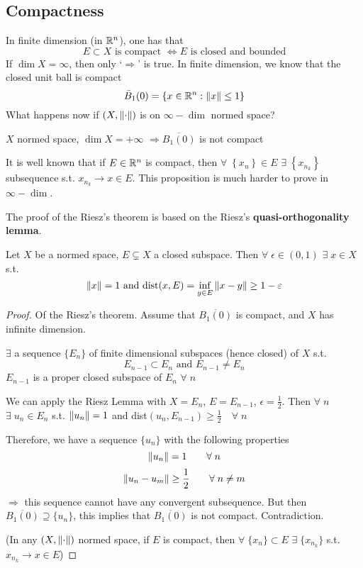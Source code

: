 \subsection*{Compactness}
In finite dimension (in \(\mathbb{R}^n\)), one has that
\[
    E \subset X \mbox{ is compact } \Leftrightarrow E \mbox{ is closed and bounded}
\]
If \(\dim X = \infty\), then only `\(\Rightarrow\)' is true. In finite dimension, we know that the closed unit ball is compact
\[
    \bar{B}_1(0) = \left\{ x \in \mathbb{R}^n : \norm{x} \leq 1\right\}
\]
What happens now if \((X, \norm{\cdot})\) is on \(\infty-\dim\) normed space?
\begin{theorem}
    \(X\) normed space, \(\dim X = +\infty\) \(\Rightarrow \overline{B_1(0)}\) is not compact
\end{theorem}
\begin{remark}
    It is well known that if \(E \in \mathbb{R}^n\) is compact, then \(\forall \; \left\{ x_n \right\} \in E \) \(\exists \; \left\{ x_{n_k} \right\}\) subsequence s.t. \(x_{n_k} \to x \in E\).  
    This proposition is much harder to prove in \(\infty-\dim\).
\end{remark}
The proof of the Riesz's theorem is based on the Riesz's \textbf{quasi-orthogonality lemma}.
\begin{lemma}
    Let \(X\) be a normed space, \(E \subsetneq X\) a closed subspace. 
    Then \(\forall \; \epsilon \in (0,1)\) \(\exists \; x \in X\) s.t.
    \[
        \norm{x}=1 \text{ and dist}(x, E) = \inf_{y \in E} \norm{x-y} \geq 1- \varepsilon
    \]
\end{lemma}
\begin{proof}
    Of the Riesz's theorem. Assume that \(\overline{B_1(0)}\) is compact, and \(X \) has infinite dimension. 

    \(\exists\) a sequence \(\{E_n\}\) of finite dimensional subspaces (hence closed) of \(X\) s.t. 
    \[
        E_{n-1} \subset E_n \text{ and } E_{n-1} \neq E_n
    \]
    \(E_{n-1}\) is a proper closed subspace of \(E_n\) \(\forall\; n\)

    We can apply the Riesz Lemma with \(X = E_n\), \(E=E_{n-1}\), \(\epsilon=\frac{1}{2}\). 
    Then \(\forall \; n\) \(\exists \; u_n \in E_n  \) s.t. \(\norm{u_n}=1\) and dist\((u_n, E_{n-1}) \geq \frac{1}{2} \quad \forall\; n\)
    
    Therefore, we have a sequence \(\{u_n\}\) with the following properties 
    \[
        \norm{u_n}=1 \qquad \forall\; n
    \]
    \[
        \norm{u_n-u_m} \geq \frac{1}{2} \qquad \forall\; n \neq m
    \]
    \(\Rightarrow\) this sequence cannot have any convergent subsequence. 
    But then \(\overline{B_1(0)} \supseteq \{u_n\}\), this implies that \(\overline{B_1(0)}\) is not compact.
    Contradiction.

    (In any \(\left(X, \norm{\cdot}\right)\) normed space, if \(E\) is compact, 
    then \(\forall\; \{x_n\} \subset E \) \(\exists \; \{x_{n_k}\}\) s.t. \(x_{n_k} \rightarrow x \in E\))
\end{proof}